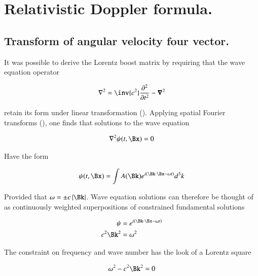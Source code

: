 %

\chapter{Relativistic Doppler formula.}
\label{chap:frequencyTx}

\date{June 27, 2009 $RCSfile: frequencyTx.tex,v $ Last $Revision: 1.6 $ $Date: 2009/10/22 02:07:20 $}

\beginArtWithToc

\section{Transform of angular velocity four vector.}

It was possible to derive the Lorentz boost matrix by requiring that the wave equation operator

\begin{align}
\grad^2 = \inv{c^2}\frac{\partial^2}{\partial t^2} - \spacegrad^2
\end{align}

retain its form under linear transformation ().  Applying spatial Fourier transforms (), one finds that solutions to the wave equation 

\begin{align}
\grad^2 \psi(t,\Bx) = 0
\end{align}

Have the form

\begin{align}
\psi(t, \Bx) = \int A(\Bk) e^{i(\Bk \cdot \Bx - \omega t)} d^3 k
\end{align}

Provided that $\omega = \pm c \Abs{\Bk}$.  Wave equation solutions can therefore be thought of as continuously weighted superpositions of constrained fundamental solutions

\begin{align}
\psi &= e^{i(\Bk \cdot \Bx - \omega t)} \\
c^2 \Bk^2 &= \omega^2
\end{align}

The constraint on frequency and wave number has the look of a Lorentz square

\begin{align}
\omega^2 - c^2 \Bk^2 = 0
\end{align}

